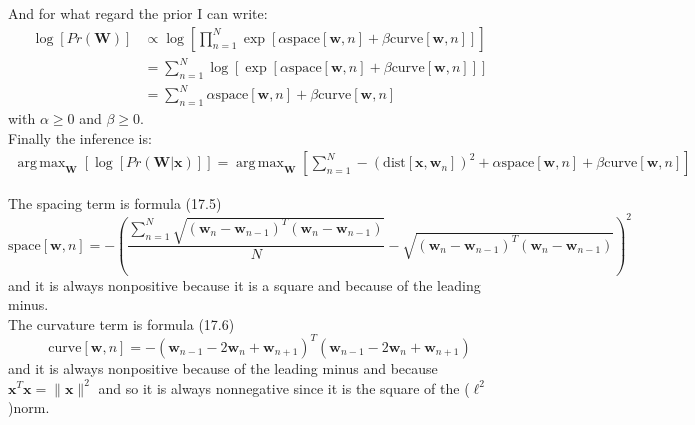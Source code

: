 \documentclass[a4paper,12pt]{article}
\DeclareMathOperator*{\argmax}{arg\,max}
\begin{document}
And for what regard the prior I can write:
\begin{equation}
\begin{split}
\log{[Pr(\mathbf{W})]} & \propto \log{[\prod_{n=1}^N \exp{[\alpha \text{space}[\mathbf{w},n]+\beta \text{curve}[\mathbf{w},n]]}]} \\
& = \sum_{n=1}^N \log{[\exp{[\alpha \text{space}[\mathbf{w},n]+\beta \text{curve}[\mathbf{w},n]]}]} \\
& = \sum_{n=1}^N \alpha \text{space}[\mathbf{w},n]+\beta \text{curve}[\mathbf{w},n]
\end{split}
\end{equation}
with $\alpha\geq0$ and $\beta\geq0$.\\

Finally the inference is:
\begin{equation}
\begin{split}
\argmax_{\mathbf{W}}[\log{[Pr(\mathbf{W}\vert\mathbf{x})]}] = \argmax_{\mathbf{W}}[\sum_{n=1}^N -(\text{dist}[\mathbf{x},\mathbf{w}_n])^2+\alpha \text{space}[\mathbf{w},n]+\beta \text{curve}[\mathbf{w},n]]
\end{split}
\end{equation}

The spacing term is formula (17.5)
\begin{equation}
\text{space}[\mathbf{w},n]= - \left(\frac{\sum_{n=1}^N \sqrt{\left( \mathbf{w}_{n}-\mathbf{w}_{n-1} \right)^T\left( \mathbf{w}_{n}-\mathbf{w}_{n-1} \right)}}{N} - \sqrt{\left( \mathbf{w}_{n}-\mathbf{w}_{n-1} \right)^T\left( \mathbf{w}_{n}-\mathbf{w}_{n-1} \right)}\right)^2
\end{equation}
and it is always nonpositive because it is a square and because of the leading minus.\\

The curvature term is formula (17.6)
\begin{equation}
\text{curve}[\mathbf{w},n]= - \left(\mathbf{w}_{n-1}-2\mathbf{w}_{n}+\mathbf{w}_{n+1}\right)^T\left(\mathbf{w}_{n-1}-2\mathbf{w}_{n}+\mathbf{w}_{n+1}\right)
\end{equation}
and it is always nonpositive because of the leading minus and because $\mathbf{x}^T\mathbf{x}=\|\mathbf{x}\|^2$ and so it is always nonnegative since it is the square of the ($\ell^2$)norm.\\
\end{document}
